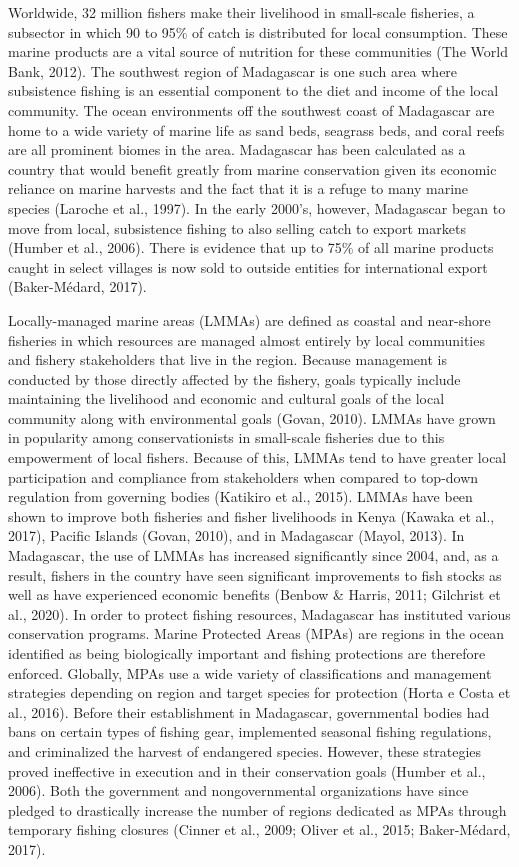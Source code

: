 \documentclass[
]{article}
\begin{document}
Worldwide, 32 million fishers make their livelihood in small-scale fisheries, a subsector in which 90 to 95\% of catch is distributed for local consumption. These marine products are a vital source of nutrition for these communities (The World Bank, 2012). The southwest region of Madagascar is one such area where subsistence fishing is an essential component to the diet and income of the local community. The ocean environments off the southwest coast of Madagascar are home to a wide variety of marine life as sand beds, seagrass beds, and coral reefs are all prominent biomes in the area. Madagascar has been calculated as a country that would benefit greatly from marine conservation given its economic reliance on marine harvests and the fact that it is a refuge to many marine species (Laroche et al., 1997). In the early 2000's, however, Madagascar began to move from local, subsistence fishing to also selling catch to export markets (Humber et al., 2006). There is evidence that up to 75\% of all marine products caught in select villages is now sold to outside entities for international export (Baker-Médard, 2017).

Locally-managed marine areas (LMMAs) are defined as coastal and near-shore fisheries in which resources are managed almost entirely by local communities and fishery stakeholders that live in the region. Because management is conducted by those directly affected by the fishery, goals typically include maintaining the livelihood and economic and cultural goals of the local community along with environmental goals (Govan, 2010). LMMAs have grown in popularity among conservationists in small-scale fisheries due to this empowerment of local fishers. Because of this, LMMAs tend to have greater local participation and compliance from stakeholders when compared to top-down regulation from governing bodies (Katikiro et al., 2015). LMMAs have been shown to improve both fisheries and fisher livelihoods in Kenya (Kawaka et al., 2017), Pacific Islands (Govan, 2010), and in Madagascar (Mayol, 2013). In Madagascar, the use of LMMAs has increased significantly since 2004, and, as a result, fishers in the country have seen significant improvements to fish stocks as well as have experienced economic benefits (Benbow \& Harris, 2011; Gilchrist et al., 2020). In order to protect fishing resources, Madagascar has instituted various conservation programs. Marine Protected Areas (MPAs) are regions in the ocean identified as being biologically important and fishing protections are therefore enforced. Globally, MPAs use a wide variety of classifications and management strategies depending on region and target species for protection (Horta e Costa et al., 2016). Before their establishment in Madagascar, governmental bodies had bans on certain types of fishing gear, implemented seasonal fishing regulations, and criminalized the harvest of endangered species. However, these strategies proved ineffective in execution and in their conservation goals (Humber et al., 2006). Both the government and nongovernmental organizations have since pledged to drastically increase the number of regions dedicated as MPAs through temporary fishing closures (Cinner et al., 2009; Oliver et al., 2015; Baker-Médard, 2017).
\end{document}
